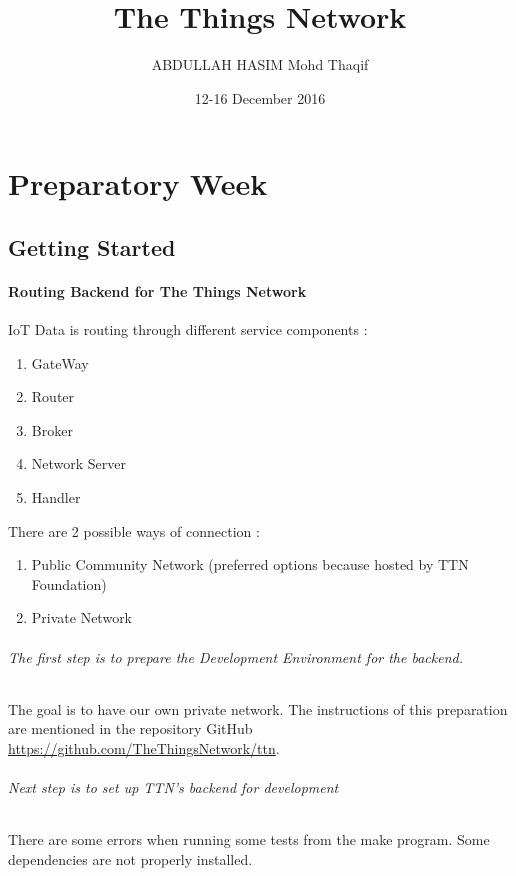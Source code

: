 \documentclass{report}
\title{The Things Network}
\author{ABDULLAH HASIM Mohd Thaqif}
\date{12-16 December 2016}
\begin{document}
\maketitle
\part{Preparatory Week}
\chapter{Getting Started}

\subsection{Routing Backend for The Things Network}
\begin{flushleft}
 IoT Data is routing through different service components :
\end{flushleft}
\begin{enumerate}
 \item GateWay
 \item Router
 \item Broker
 \item Network Server
 \item Handler
\end{enumerate}

\begin{flushleft}
 There are 2 possible ways of connection :
\end{flushleft}
 \begin{enumerate}
  \item Public Community Network (preferred options because hosted by TTN Foundation)
  \item Private Network
 \end{enumerate}

 \paragraph{The first step is to prepare the Development Environment for the backend.}The goal is to have our own private network.
 The instructions of this preparation are mentioned in the repository GitHub \url{https://github.com/TheThingsNetwork/ttn}.
\paragraph{Next step is to set up TTN's backend for development} There are some errors when running some tests from the make program.
Some dependencies are not properly installed.  
  
\end{document}
